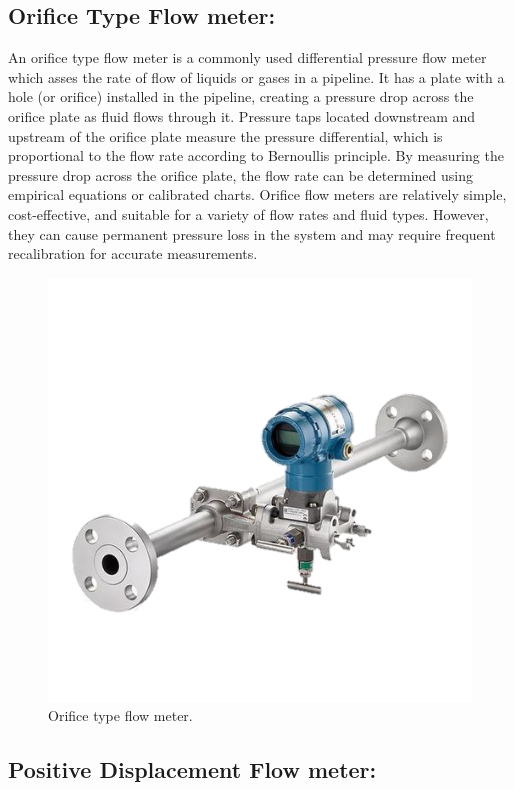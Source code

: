 \subsection{Orifice Type Flow meter:}

An orifice type flow meter is a commonly used differential pressure flow
meter which asses the rate of flow of liquids or gases in a pipeline. It
has a plate with a hole (or orifice) installed in the pipeline, creating
a pressure drop across the orifice plate as fluid flows through it.
Pressure taps located downstream and upstream of the orifice plate
measure the pressure differential, which is proportional to the flow
rate according to Bernoulli\textquotesingle s principle. By measuring
the pressure drop across the orifice plate, the flow rate can be
determined using empirical equations or calibrated charts. Orifice flow
meters are relatively simple, cost-effective, and suitable for a variety
of flow rates and fluid types. However, they can cause permanent
pressure loss in the system and may require frequent recalibration for
accurate measurements.


\begin{figure}[h!]
    \centering
    \includegraphics[width=0.8\linewidth]{figs/flowmeters/image19.png}
    \caption{Orifice type flow meter.}
    \label{fig:orifice_flow_meter}
\end{figure}


\subsection{Positive Displacement Flow meter:}


